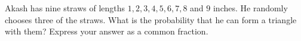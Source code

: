 Akash has nine straws of lengths $1,2,3,4,5,6,7,8$ and $9$ inches. He randomly chooses three of the straws. What is the probability that he can form a triangle with them? Express your answer as a common fraction.
